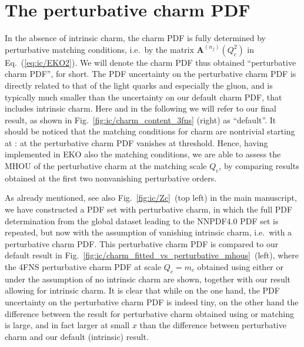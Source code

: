 \section{The perturbative charm PDF}
\label{app:ic/consistency}

In the absence of intrinsic charm, the charm PDF is fully determined by
perturbative matching conditions, i.e.\ by the matrix
$\mathbf{A}^{(n_f)}(Q_{c}^2)$ in Eq.~(\ref{eq:ic/EKO2}).
%
We will denote the
charm PDF thus obtained
``perturbative charm PDF'', for short. The PDF
uncertainty on the perturbative charm PDF is directly related to that 
of the light quarks and especially the gluon, and is typically much smaller
than  the  uncertainty on our default charm PDF, that includes
intrinsic charm. Here and in the following we will refer to our final
result, as shown in Fig.~\ref{fig:ic/charm_content_3fns} (right) as ``default''.
%
It should be noticed that the matching conditions for charm are 
nontrivial starting
at \nnlo: at \nlo the perturbative charm PDF vanishes at threshold.
%
Hence, having implemented in EKO also the \nnnlo matching conditions,
we are able to assess the MHOU of the perturbative charm at the
matching scale $Q_c$, by comparing
results obtained at the first two nonvanishing perturbative
orders.

As already mentioned, see also Fig.~\ref{fig:ic/Zc}~(top left) in the main manuscript, we have
constructed a PDF set with perturbative charm, in which the full PDF
determination from the global dataset leading to the NNPDF4.0 PDF set
is repeated, but now with the assumption of vanishing intrinsic charm,
i.e.\ with a perturbative charm PDF.
%
This perturbative charm PDF is compared to our default result
in Fig.~\ref{fig:ic/charm_fitted_vs_perturbative_mhous}~(left), where the 4FNS
perturbative 
charm PDF at scale  $Q_c=m_c$ obtained using either \nnlo or \nnnlo
under the assumption of no intrinsic charm are shown, together with
our  result allowing for intrinsic charm.
%
It is clear that while on the one hand, the PDF uncertainty on the
perturbative charm PDF is indeed tiny, on the other
hand the difference between the result for perturbative charm
obtained using \nnlo or \nnnlo matching is large, and in
fact larger at small $x$ than the difference between perturbative charm and our
default (intrinsic) result.

